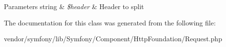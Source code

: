 \begin{DoxyParams}[1]{\-Parameters}
string & {\em \$header} & \-Header to split \\
\hline
\end{DoxyParams}


\-The documentation for this class was generated from the following file\-:\begin{DoxyCompactItemize}
\item 
vendor/symfony/lib/\-Symfony/\-Component/\-Http\-Foundation/\-Request.\-php\end{DoxyCompactItemize}
